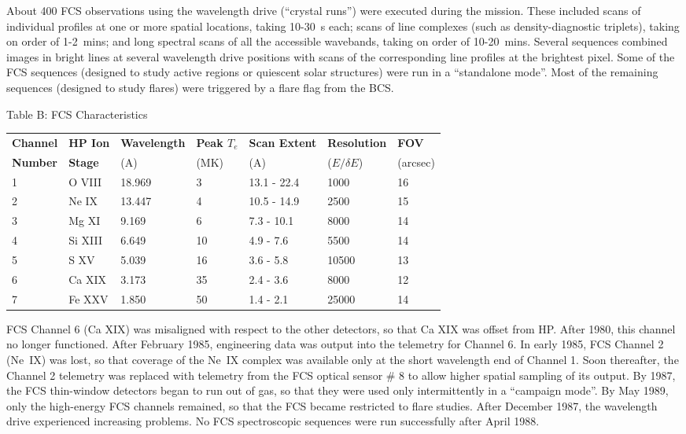 About 400 FCS observations using the wavelength drive (``crystal runs'') were
executed during the mission. These included scans of individual profiles at one
or more spatial locations, taking 10-30~s each; scans of line complexes
(such as density-diagnostic triplets), taking on order of 1-2~mins; and long
spectral scans of all the accessible wavebands, taking on order of 10-20~mins.
Several sequences combined images in bright lines at several wavelength drive
positions with scans of the corresponding line profiles at the brightest pixel.
Some of the FCS sequences (designed to study active regions or quiescent solar
structures) were run in a ``standalone mode''. Most of the remaining sequences
(designed to study flares) were triggered by a flare flag from the BCS. 

\begin{center}
                     Table B: FCS Characteristics
\medskip
\begin{tabular}{||l l l l l l l ||}
\hline
{\bf Channel} & {\bf HP Ion} & {\bf Wavelength} & {\bf Peak $T_e$} &  {\bf Scan 
Extent} & {\bf Resolution} &    {\bf  FOV}  \\
{\bf Number} &  {\bf Stage}  &   (A)   &    (MK)     &   (A)    & ($E/\delta E$) 
&  (arcsec)\\
\hline
   1 &    O VIII & 18.969  &      3  &   13.1 - 22.4  &    1000  &        16  \\
   2 &    Ne IX  & 13.447  &      4  &   10.5 - 14.9  &    2500  &        15  \\
   3 &    Mg XI  &  9.169  &      6  &    7.3 - 10.1  &    8000  &        14  \\
   4 &    Si XIII &  6.649  &     10 &     4.9 -  7.6 &    5500  &        14  \\
   5 &    S XV   &  5.039  &     16  &    3.6 -  5.8  &   10500  &        13  \\
   6 &    Ca XIX &  3.173  &     35  &    2.4 -  3.6  &    8000  &        12  \\
   7 &    Fe XXV &  1.850  &     50  &    1.4 -  2.1  &    25000 &        14  \\
\hline
\end{tabular}
\end{center}

FCS Channel 6 (Ca XIX) was misaligned with respect to the other detectors, so
that Ca XIX was offset from HP. After 1980, this channel no longer functioned.
After February 1985, engineering data was output into the telemetry 
for Channel 6. In early 1985, FCS Channel 2 (Ne~IX) was lost, so that coverage 
of the Ne~IX complex was available only at the short wavelength end of Channel
1. Soon thereafter, the Channel 2 telemetry was replaced with telemetry from
the FCS optical sensor \# 8 to allow higher spatial sampling of its output. By
1987, the FCS thin-window detectors began to run out of gas, so that they were
used only intermittently in a ``campaign mode''.  By May 1989, only the 
high-energy FCS channels remained, so that the FCS became restricted to flare
studies. After December 1987, the wavelength drive experienced increasing
problems. No FCS spectroscopic sequences were run successfully after April
1988. 

